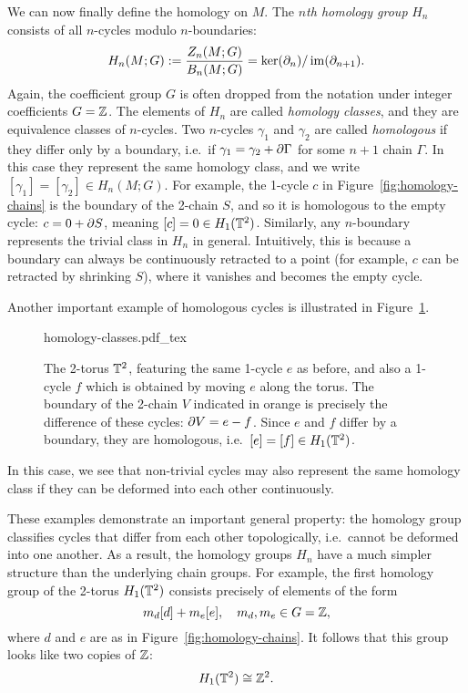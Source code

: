 We can now finally define the homology on $M$. The \emph{$n$th homology group} $H_n$ consists of all $n$-cycles modulo $n$-boundaries:
\begin{equation*}
	H_n(M;G) := \frac{Z_n(M;G)}{B_n(M;G)} = \ker(\partial_n) / \operatorname{im}(\partial_{n+1}).
\end{equation*}
Again, the coefficient group $G$ is often dropped from the notation under integer coefficients $G=\mathbb{Z}$. The elements of $H_n$ are called \emph{homology classes}, and they are equivalence classes of $n$-cycles. Two $n$-cycles $\gamma_1$ and $\gamma_2$ are called \emph{homologous} if they differ only by a boundary, i.e.\ if $\gamma_1 = \gamma_2 + \partial\Gamma$ for some $n+1$ chain $\Gamma$. In this case they represent the same homology class, and we write $[\gamma_1] = [\gamma_2]\in H_n(M;G)$. For example, the 1-cycle $c$ in Figure~\ref{fig:homology-chains} is the boundary of the 2-chain $S$, and so it is homologous to the empty cycle: $c= 0 + \partial S$, meaning $[c] = 0\in H_1(\mathbb{T}^2)$. Similarly, any $n$-boundary represents the trivial class in $H_n$ in general. Intuitively, this is because a boundary can always be continuously retracted to a point (for example, $c$ can be retracted by shrinking $S$), where it vanishes and becomes the empty cycle.

Another important example of homologous cycles is illustrated in Figure~\ref{fig:homology-classes}.
\begin{figure}[htb!]
	\centering
	\def\svgwidth{.6\linewidth}
	{homology-classes.pdf_tex}
	\caption{The 2-torus $\mathbb{T}^2$, featuring the same 1-cycle $e$ as before, and also a 1-cycle $f$ which is obtained by moving $e$ along the torus. The boundary of the 2-chain $V$ indicated in orange is precisely the difference of these cycles: $\partial V = e - f$. Since $e$ and $f$ differ by a boundary, they are homologous, i.e.\ $[e]=[f]\in H_1(\mathbb{T}^2)$.} %
	\label{fig:homology-classes}
\end{figure}
In this case, we see that non-trivial cycles may also represent the same homology class if they can be deformed into each other continuously.

These examples demonstrate an important general property: the homology group classifies cycles that differ from each other topologically, i.e.\ cannot be deformed into one another. As a result, the homology groups $H_n$ have a much simpler structure than the underlying chain groups. For example, the first homology group of the 2-torus $H_1(\mathbb{T}^2)$ consists precisely of elements of the form
\begin{equation*}
	m_d[d] + m_e[e],\quad m_d,m_e\in G=\mathbb{Z},
\end{equation*}
where $d$ and $e$ are as in Figure~\ref{fig:homology-chains}. It follows that this group looks like two copies of $\mathbb{Z}$:
\begin{equation*}
	H_1(\mathbb{T}^2) \cong \mathbb{Z}^2.
\end{equation*}

